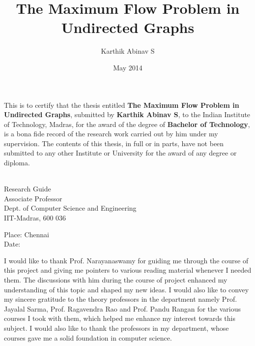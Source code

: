 \documentclass[BTech]{iitmdiss}
\def\thesistitle{The Maximum Flow Problem in Undirected Graphs}
\def\thesisauthor{Karthik Abinav S}
\begin{document}


\title{\thesistitle}

\author{\thesisauthor}

\date{May 2014}

\begin{singlespace}
\maketitle 
\end{singlespace} 


\newtheorem{thm}{Theorem}
\newtheorem{lemma}{Lemma}
\newtheorem{prop}{Proposition}
\newtheorem{modif}{Modification}
\newtheorem{defn}{Definition}

\certificate

\vspace*{0.5in}

\noindent This is to certify that the thesis entitled {\bf {\thesistitle}}, 
submitted by {\bf {\thesisauthor}}, to the Indian Institute of Technology, 
Madras, for the award of the degree of {\bf Bachelor of Technology}, 
is a bona fide record of the research work carried out by him under my
supervision. The contents of this thesis, in full or in parts, have not been
submitted to any other Institute or University for the award of any degree or
diploma.

\vspace*{1.4in}
\hspace*{-0.25in}
\begin{singlespace}
 \\
\noindent Research Guide \\ 
\noindent Associate Professor \\
\noindent Dept. of Computer Science and Engineering\\
\noindent IIT-Madras, 600 036 \\
\end{singlespace}
\vspace*{0.20in}
\noindent Place: Chennai\\ 
Date:

\acknowledgements

  I would like to thank Prof. Narayanaswamy for guiding me through the course of this project and giving me pointers to various reading material
  whenever I needed them. The discussions with him during the course of project enhanced my understanding of this topic and shaped my new ideas.
  I would also like to convey my sincere gratitude to the theory professors in the department namely Prof. Jayalal Sarma, Prof. Ragavendra Rao and
  Prof. Pandu Rangan for the various courses I took with them, which helped me enhance my interest towards this subject. I would also like to thank the 
  professors in my department, whose courses gave me a solid foundation in computer science.\\
  
\end{document}
